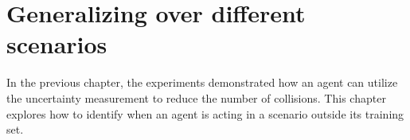 \chapter{Generalizing over different scenarios} \label{ch:generalize}



In the previous chapter, the experiments demonstrated how an agent can utilize the uncertainty measurement to reduce the number of collisions. This chapter explores how to identify when an agent is acting in a scenario outside its training set.

